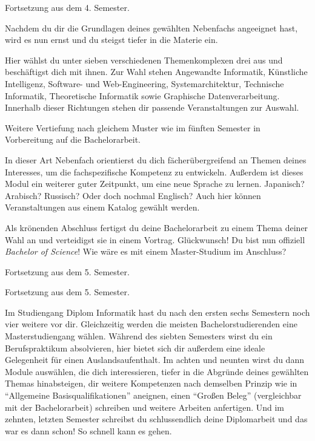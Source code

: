 Fortsetzung aus dem 4. Semester.

Nachdem du dir die Grundlagen deines gewählten Nebenfachs angeeignet hast, wird es nun ernst und du steigst tiefer in die Materie ein.

Hier wählst du unter sieben verschiedenen Themenkomplexen drei aus und beschäftigst dich mit ihnen.
Zur Wahl stehen Angewandte Informatik, Künstliche Intelligenz, Software- und Web-Engineering, Systemarchitektur, Technische Informatik, Theoretische Informatik sowie Graphische Datenverarbeitung.
Innerhalb dieser Richtungen stehen dir passende Veranstaltungen zur Auswahl.


Weitere Vertiefung nach gleichem Muster wie im fünften Semester in Vorbereitung auf die Bachelorarbeit.

\label{lec:aqua}
In dieser Art Nebenfach orientierst du dich fächerübergreifend an Themen deines Interesses, um die fachspezifische Kompetenz zu entwickeln.
Außerdem ist dieses Modul ein weiterer guter Zeitpunkt, um eine neue Sprache zu lernen. Japanisch? Arabisch? Russisch? Oder doch nochmal Englisch?
Auch hier können Veranstaltungen aus einem Katalog gewählt werden.

\newpage

Als krönenden Abschluss fertigst du deine Bachelorarbeit zu einem Thema deiner Wahl an und verteidigst sie in einem Vortrag.
Glückwunsch! Du bist nun offiziell \textit{Bachelor of Science}! Wie wäre es mit einem Master-Studium im Anschluss?

Fortsetzung aus dem 5. Semester.

Fortsetzung aus dem 5. Semester.


Im Studiengang Diplom Informatik hast du nach den ersten sechs Semestern noch vier weitere vor dir. Gleichzeitig werden die meisten Bachelorstudierenden eine Masterstudiengang wählen.
Während des siebten Semesters wirst du ein Berufspraktikum absolvieren, hier bietet sich dir außerdem eine ideale Gelegenheit für einen Auslandsaufenthalt.
Im achten und neunten wirst du dann Module auswählen, die dich interessieren, tiefer in die Abgründe deines gewählten Themas hinabsteigen, dir weitere Kompetenzen nach demselben Prinzip wie in \enquote{Allgemeine Basisqualifikationen} aneignen, einen \enquote{Großen Beleg} (vergleichbar mit der Bachelorarbeit) schreiben und weitere Arbeiten anfertigen.
Und im zehnten, letzten Semester schreibst du schlussendlich deine Diplomarbeit und das war es dann schon!
So schnell kann es gehen.

